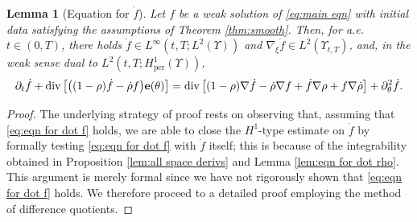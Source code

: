 \documentclass[11pt,a4paper,reqno]{amsart}
\newtheorem{lemma}[prop]{Lemma}
\theoremstyle{remark}
\theoremstyle{definition}
\numberwithin{equation}{section}
\newcommand{\per}{\mathrm{per}}
\DeclareMathOperator{\dv}{div}
\newcommand{\e}{{\bf e}}
\newcommand{\bxi}{\xi}
\begin{document}
\begin{lemma}[Equation for $\dot{f}$]\label{lem:eqn for dot f}
   Let $f$ be a weak solution of \eqref{eq:main eqn} with initial data satisfying the assumptions of Theorem \ref{thm:smooth}. Then, for a.e.~$t \in (0,T)$, there holds $\dot{f} \in L^\infty(t,T;L^2(\Upsilon))$ and $\nabla_{\bxi} \dot{f} \in L^2(\Upsilon_{t,T})$, and, in the weak sense dual to $L^2(t,T;H^1_\per(\Upsilon))$, 
    \begin{equation}\label{eq:eqn for dot f}
        \partial_t \dot{f} + \dv\big[\big((1-\rho)\dot{f} - \dot{\rho} f \big)\e(\theta) \big] = \dv\big[ (1-\rho)\nabla \dot{f} - \dot{\rho} \nabla f + \dot{f} \nabla \rho + f \nabla\dot{\rho}  \big] + \partial^2_\theta \dot{f}. 
    \end{equation}
\end{lemma}
\begin{proof}
The underlying strategy of proof rests on observing that, assuming that \eqref{eq:eqn for dot f} holds, we are able to close the $H^1$-type estimate on $\dot{f}$ by formally testing \eqref{eq:eqn for dot f} with $\dot{f}$ itself; this is because of the integrability obtained in Proposition \ref{lem:all space derivs} and Lemma \ref{lem:eqn for dot rho}. This argument is merely formal since we have not rigorously shown that \eqref{eq:eqn for dot f} holds. We therefore proceed to a detailed proof employing the method of difference quotients. 


\smallskip 


\end{proof}
\end{document}
